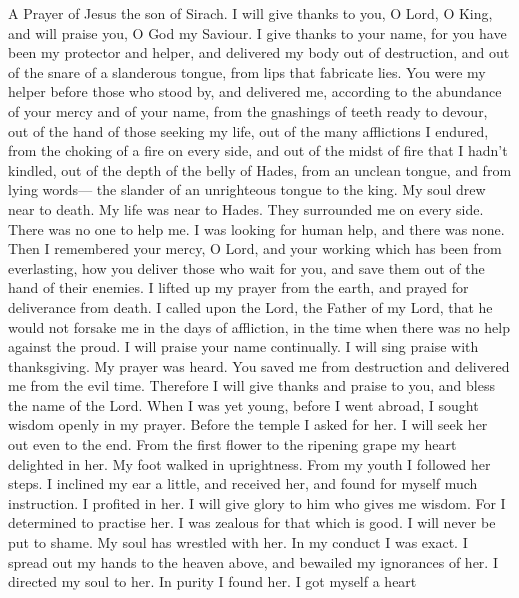 A Prayer of Jesus the son of Sirach.  I will give thanks to
you, O Lord, O King, and will praise you, O God my Saviour. I give
thanks to your name,  for you have been my protector and
helper, and delivered my body out of destruction, and out of the snare
of a slanderous tongue, from lips that fabricate lies. You were my
helper before those who stood by,  and delivered me,
according to the abundance of your mercy and of your name, from the
gnashings of teeth ready to devour, out of the hand of those seeking my
life, out of the many afflictions I endured,  from the
choking of a fire on every side, and out of the midst of fire that I
hadn't kindled,  out of the depth of the belly of Hades,
from an unclean tongue, and from lying words---  the slander
of an unrighteous tongue to the king. My soul drew near to death. My
life was near to Hades.  They surrounded me on every side.
There was no one to help me. I was looking for human help, and there was
none.  Then I remembered your mercy, O Lord, and your
working which has been from everlasting, how you deliver those who wait
for you, and save them out of the hand of their enemies.  I
lifted up my prayer from the earth, and prayed for deliverance from
death.  I called upon the Lord, the Father of my Lord, that
he would not forsake me in the days of affliction, in the time when
there was no help against the proud.  I will praise your
name continually. I will sing praise with thanksgiving. My prayer was
heard.  You saved me from destruction and delivered me from
the evil time. Therefore I will give thanks and praise to you, and bless
the name of the Lord.  When I was yet young, before I went
abroad, I sought wisdom openly in my prayer.  Before the
temple I asked for her. I will seek her out even to the end.
 From the first flower to the ripening grape my heart
delighted in her. My foot walked in uprightness. From my youth I
followed her steps.  I inclined my ear a little, and
received her, and found for myself much instruction.  I
profited in her. I will give glory to him who gives me wisdom.
 For I determined to practise her. I was zealous for that
which is good. I will never be put to shame.  My soul has
wrestled with her. In my conduct I was exact. I spread out my hands to
the heaven above, and bewailed my ignorances of her.  I
directed my soul to her. In purity I found her. I got myself a heart
